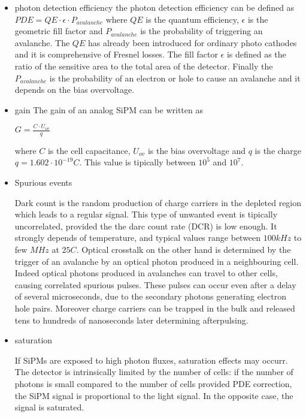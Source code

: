 \begin{itemize}
\item photon detection efficiency
the photon detection efficiency can be defined as
$PDE = QE \cdot \epsilon \cdot P_{avalanche}$
where $QE$ is the quantum efficiency, $\epsilon$ is the geometric fill factor and $P_{avalanche}$ is the probability of triggering an avalanche.
The $QE$ has already been introduced for ordinary photo cathodes and it is comprehensive of Fresnel losses.
The fill factor $\epsilon$ is defined as the ratio of the sensitive area to the total area of the detector.
Finally the $P_{avalanche}$ is the probability of an electron or hole to cause an avalanche and it depends on the bias overvoltage.

\item gain
The gain of an analog SiPM can be written as

$G = \frac{C\cdot U_{ov}}{q}$

where $C$ is the cell capacitance, $U_{ov}$ is the bias overvoltage and $q$ is the charge $q = 1.602 \cdot 10^{-19} C$.
This value is tipically between $10^{5}$ and $10^{7}$.

\item Spurious events

Dark count is the random production of charge carriers in the depleted region which leads to a regular signal. This type of unwanted event is tipically uncorrelated, provided the the darc count rate (DCR) is low enough. It strongly depends of temperature, and typical values range between $100kHz$ to few $MHz$ at $25C$.
Optical crosstalk on the other hand is determined by the trigger of an avalanche by an optical photon produced in a neighbouring cell. Indeed optical photons produced in avalanches can travel to other cells, causing correlated spurious pulses. These pulses can occur even after a delay of several microseconds, due to the secondary photons generating electron hole pairs.
Moreover charge carriers can be trapped in the bulk and released tens to hundreds of nanoseconds later determining afterpulsing.

\item saturation

If SiPMs are exposed to high photon fluxes, saturation effects may occurr. The detector is intrinsically limited by the number of cells: if the number of photons is small compared to the number of cells provided PDE correction, the SiPM signal is proportional to the light signal. In the opposite case, the signal is saturated.
\end{itemize}

